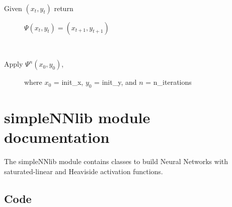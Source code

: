 \documentclass[letterpaper,10pt,english]{sphinxmanual}
\begin{document}
\begin{fulllineitems}
\begin{fulllineitems}
\end{fulllineitems}


\begin{fulllineitems}
\label{symdyn_docs:symdyn.NonlinearDynamicalAutomaton.flow}~\begin{description}
\item[{Given \((x_t,y_t)\) return}] \leavevmode
\(\Psi(x_t, y_t) = (x_{t+1}, y_{t+1})\)

\end{description}

\end{fulllineitems}


\begin{fulllineitems}
\label{symdyn_docs:symdyn.NonlinearDynamicalAutomaton.iterate}~\begin{description}
\item[{Apply \(\Psi^n(x_0, y_0)\),}] \leavevmode
where \(x_0\) = init\_x, \(y_0\)
= init\_y, and \(n\) = n\_iterations

\end{description}

\end{fulllineitems}


\end{fulllineitems}



\chapter{simpleNNlib module documentation}
\label{simpleNNlib_docs:simplennlib-module-documentation}\label{simpleNNlib_docs::doc}
The simpleNNlib module contains classes to build Neural Networks with saturated-linear and Heaviside activation functions.


\section{Code}
\label{simpleNNlib_docs:code}\label{simpleNNlib_docs:module-simpleNNlib}
\end{document}
